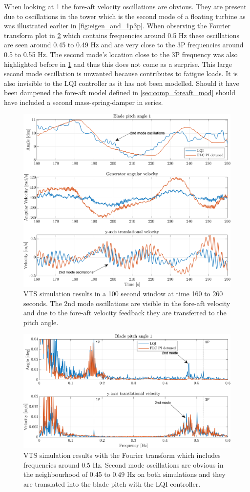 When looking at \cref{fig:vts_12_zoom_th_w_py_vy} the fore-aft velocity oscillations are obvious. They are present due to oscillations in the tower which is the second mode of a floating turbine as was illustrated earlier in \cref{fig:eigen_and_1p3p}. When observing the Fourier transform plot in \cref{fig:vts_13_zoom_fft_th_w_py_vy} which contains frequencies around 0.5 Hz these oscillations are seen around 0.45 to 0.49 Hz and are very close to the 3P frequencies around 0.5 to 0.55 Hz. The second mode's location close to the 3P frequency was also highlighted before in \cref{fig:vts_12_zoom_th_w_py_vy} and thus this does not come as a surprise. This large second mode oscillation is unwanted because contributes to fatigue loads. It is also invisible to the LQI controller as it has not been modelled. Should it have been dampened the fore-aft model defined in \cref{sec:comp_foreaft_mod} should have included a second mass-spring-damper in series.
\begin{figure}[ht]
	\centering
	\includegraphics[width=0.7\linewidth]{Graphics/TestResults/VTSplotting/12_zoom_th_w_vy.png}
	\caption{VTS simulation results in a 100 second window at time 160 to 260 seconds. The 2nd mode oscillations are visible in the fore-aft velocity and due to the fore-aft velocity feedback they are transferred to the pitch angle.}
	\label{fig:vts_12_zoom_th_w_py_vy}
\end{figure}
\begin{figure}[ht]
	\centering
	\includegraphics[width=0.7\linewidth]{Graphics/TestResults/VTSplotting/13_zoom_fft_th_vy.png}
	\caption{VTS simulation results with the Fourier transform which includes frequencies around 0.5 Hz. Second mode oscillations are obvious in the neighbourhood of 0.45 to 0.49 Hz on both simulations and they are translated into the blade pitch with the LQI controller.}
	\label{fig:vts_13_zoom_fft_th_w_py_vy}
\end{figure}

